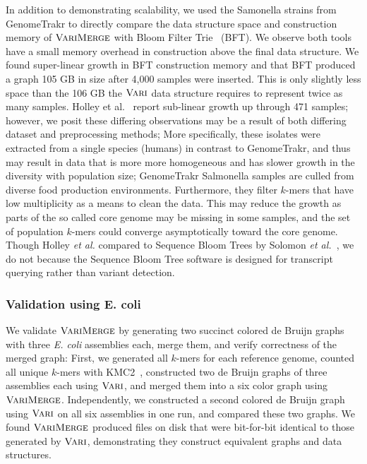 In addition to demonstrating scalability, we used the Samonella strains from GenomeTrakr to directly compare the data structure space and construction memory of $\mbox{\rm {\sc VariMerge}}$ with Bloom Filter Trie~\cite{holley2015bloom} (BFT).  We observe both tools have a small memory overhead in construction above the final data structure. We found super-linear growth in BFT construction memory
and that BFT produced a graph 105 GB in size after 4,000 samples were inserted. This is only slightly less space than the 106 GB the $\mbox{\rm {\sc Vari}}$ data structure requires to represent twice as many samples.  Holley  et al.~\cite{holley2015bloom} report  sub-linear growth up through 471 samples; however, we posit these differing observations may be a result of both differing dataset and preprocessing methods; More specifically, these isolates were extracted from a single species (humans) in contrast to GenomeTrakr, and thus may result in data that is more more homogeneous and has slower growth in the diversity with population size;  GenomeTrakr Salmonella samples are culled from  diverse food production environments.  Furthermore, they filter $k$-mers that have low multiplicity as a means to clean the data. This may reduce the growth as parts of the so called core genome may be missing in some samples, and the set of population $k$-mers could converge asymptotically toward the core genome.  Though Holley {\it et al.} compared to Sequence Bloom Trees by Solomon {\it et al.}~\cite{solomon2015large}, we do not because the Sequence Bloom Tree software is designed for transcript querying rather than variant detection.
















\subsubsection{Validation using E. coli}


We validate $\mbox{\rm {\sc VariMerge}}$ by generating two succinct colored de Bruijn graphs with three \emph{E. coli} assemblies each, merge them, and verify correctness of the merged graph:    First, we generated all $k$-mers for each reference genome, counted all unique $k$-mers with KMC2~\cite{deorowicz2015kmc}, constructed two de Bruijn graphs of three assemblies each using $\mbox{\rm {\sc Vari}}$, and merged them into a six color graph using $\mbox{\rm {\sc VariMerge}}$.  Independently, we constructed a second colored de Bruijn graph using $\mbox{\rm {\sc Vari}}$ on all six assemblies in one run, and compared these two graphs.  We found $\mbox{\rm {\sc VariMerge}}$ produced files on disk that were bit-for-bit identical to those generated by $\mbox{\rm {\sc Vari}}$, demonstrating they construct equivalent graphs and data structures.






